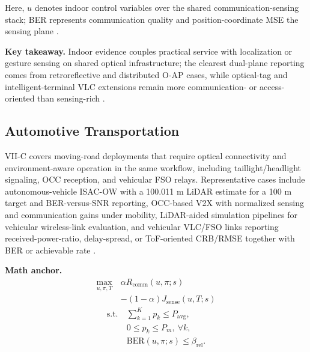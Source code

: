 \documentclass[letterpaper,journal]{IEEEtran}
\begin{document}
Here, $u$ denotes indoor control variables over the shared communication-sensing stack; BER represents communication quality and position-coordinate MSE the sensing plane \cite{O_ISAC_108,O_ISAC_388}.

\textbf{Key takeaway.} Indoor evidence couples practical service with localization or gesture sensing on shared optical infrastructure; the clearest dual-plane reporting comes from retroreflective and distributed O-AP cases, while optical-tag and intelligent-terminal VLC extensions remain more communication- or access-oriented than sensing-rich \cite{O_ISAC_291,O_ISAC_386}.

\subsection{Automotive Transportation}

VII-C covers moving-road deployments that require optical connectivity and environment-aware operation in the same workflow, including taillight/headlight signaling, OCC reception, and vehicular FSO relays. Representative cases include autonomous-vehicle ISAC-OW with a 100.011 m LiDAR estimate for a 100 m target and BER-versus-SNR reporting, OCC-based V2X with normalized sensing and communication gains under mobility, LiDAR-aided simulation pipelines for vehicular wireless-link evaluation, and vehicular VLC/FSO links reporting received-power-ratio, delay-spread, or ToF-oriented CRB/RMSE together with BER or achievable rate \cite{O_ISAC_003,O_ISAC_055,O_ISAC_060,O_ISAC_109,O_ISAC_164}.

\textbf{Math anchor.}
\begin{equation}
    \begin{split}
        \max_{u,\pi,T}\  & \alpha R_{\mathrm{comm}}(u,\pi;s)    \\
                         & -(1-\alpha)J_{\mathrm{sense}}(u,T;s)
    \end{split}
\end{equation}
\begin{equation}
    \begin{split}
        \text{s.t.}\  & \sum_{k=1}^{K} p_k \le P_{\mathrm{avg}},       \\
                      & 0 \le p_k \le P_m,\ \forall k,                 \\
                      & \mathrm{BER}(u,\pi;s)\le \beta_{\mathrm{rel}}.
    \end{split}
\end{equation}
\end{document}
